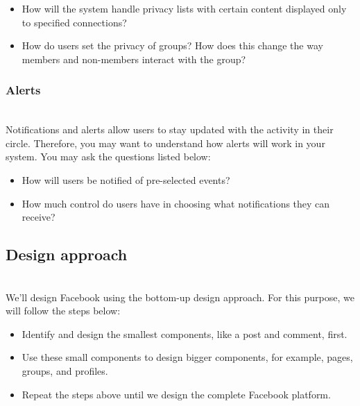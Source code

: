 \begin{itemize}
\item
\protect{}\label{H2j61vMfOMuzXArJ9tOBY}
How will the system handle privacy lists with certain content displayed only to specified connections?
\item
\protect{}\label{Ul9n4tlmbg_68VR9Tnj5Q}
How do users set the privacy of groups? How does this change the way members and non-members interact with the group?
\end{itemize}

\subsubsection{Alerts}\label{kzWHQSZX_PNtO897HE1Rv}
\\
Notifications and alerts allow users to stay updated with the activity in their circle. Therefore, you may want to understand how alerts will work in your system. You may ask the questions listed below:

\begin{itemize}
\item
\protect{}\label{ZWeuBiOu4LESPz3OEq_4a}
How will users be notified of pre-selected events?
\item
\protect{}\label{bwjonxEbYNNZpz5w6aq6E}
How much control do users have in choosing what notifications they can receive?
\end{itemize}

\subsection{Design approach}\label{VQfLJBfYFU2JanMuti5ND}
\\
We'll design Facebook using the bottom-up design approach. For this purpose, we will follow the steps below:

\begin{itemize}
\item
\protect{}\label{MchfvGRkeLfdZJ3-9fs2t}
Identify and design the smallest components, like a post and comment, first.
\item
\protect{}\label{RDEIXVmvWAZttt5SedON-}
Use these small components to design bigger components, for example, pages, groups, and profiles.
\item
\protect{}\label{gcAa9-H9BDofY-TsEiFlD}
Repeat the steps above until we design the complete Facebook platform.
\end{itemize}


